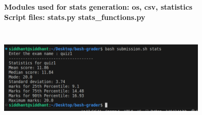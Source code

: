 \documentclass{article}
\begin{document}
\textbf{Modules used for stats generation: os, csv, statistics}\\

\textbf{Script files: stats.py stats\_functions.py}\\
\begin{center}
    \includegraphics[height=5cm,width=10cm]{stats.png}
\end{center}
\end{document}
